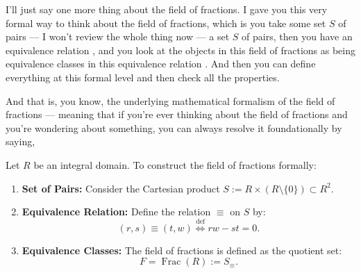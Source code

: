 \begin{speech}[00:01:00 - 00:01:46]
I'll just say one more thing about the field of fractions. I gave you this very formal way to think about the field of fractions, which is you take some set $S$ of pairs  --- I won't review the whole thing now --- a set $S$ of pairs, then you have an equivalence relation , and you look at the objects in this field of fractions as being equivalence classes in this equivalence relation . And then you can define everything at this formal level and then check all the properties.

And that is, you know, the underlying mathematical formalism of the field of fractions --- meaning that if you're ever thinking about the field of fractions and you're wondering about something, you can always resolve it foundationally by saying, 
\end{speech}

\begin{content}

Let $R$ be an integral domain. To construct the field of fractions formally:
\begin{enumerate}[label=\textbf{(\arabic*)}]
    \setcounter{enumi}{0} \item \textbf{Set of Pairs:} Consider the Cartesian product $S := R \times (R \setminus \{0\}) \subset R^2$.
    \setcounter{enumi}{1} \item \textbf{Equivalence Relation:} Define the relation $\equiv$ on $S$ by:
    \[
    (r, s) \equiv (t, w) \stackrel{\text{def}}{\iff} rw - st = 0.
    \]
    \setcounter{enumi}{2} \item \textbf{Equivalence Classes:} The field of fractions is defined as the quotient set:
    \[
    F = \operatorname{Frac}(R) := S_{\equiv}.
    \]
\end{enumerate}
\end{content}

